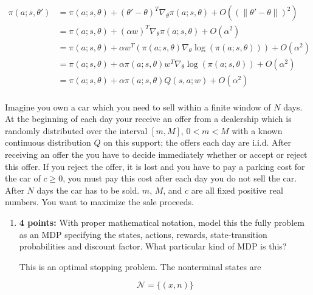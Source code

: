 \documentclass[12pt]{exam}
\begin{document}
\begin{questions}
\begin{enumerate}
\begin{solution}
\begin{align*}
    \pi(a; s,\theta') &= \pi(a; s,\theta) + (\theta' - \theta)^T\nabla_{\theta}\pi(a; s,\theta) + O((\|\theta' - \theta\|)^2)\\
    &=\pi(a; s,\theta) + (\alpha w)^T\nabla_{\theta}\pi(a; s,\theta) + O(\alpha^2)\\
    &=\pi(a; s,\theta) + \alpha w^T (\pi(a;s,\theta) \nabla_{\theta}\log(\pi(a; s,\theta))) + O(\alpha^2)\\
    &=\pi(a; s,\theta) + \alpha \pi(a;s,\theta) w^T \nabla_{\theta}\log(\pi(a; s,\theta)) + O(\alpha^2)\\
    &=\pi(a; s,\theta) + \alpha \pi(a;s,\theta) Q(s,a;w) + O(\alpha^2)\\
\end{align*}

\end{solution}

\end{enumerate}

\newpage


Imagine you own a car which you need to sell within a finite window of $N$ days. At the beginning of each day your receive an offer from a dealership which is randomly distributed over the interval $[m, M]$, $0 < m < M$ with a known continuous distribution $Q$ on this support; the offers each day are i.i.d. After receiving an offer the you have to decide immediately whether or accept or reject this offer. If you reject the offer, it is lost and you have to pay a parking cost for the car of $c \geq 0$, you must pay this cost after each day you do not sell the car. After $N$ days the car has to be sold. $m$, $M$, and $c$ are all fixed positive real numbers. You want to maximize the sale proceeds.

\begin{enumerate}



\item {\bf 4 points: } With proper mathematical notation, model this the fully problem as an MDP specifying the states, actions, rewards, state-transition probabilities and discount factor. What particular kind of MDP is this?

\begin{solution}
This is an optimal stopping problem. The nonterminal states are 

\[\mathcal{N} = \{(x, n)\}\]


\end{solution}
\end{enumerate}
\end{questions}
\end{document}
